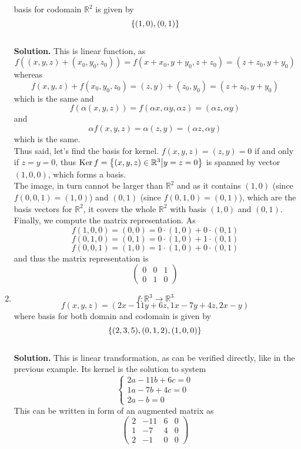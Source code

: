 \documentclass[12pt]{article} %
\begin{document}
\begin{enumerate}
	basis for codomain $\mathbb{R}^2$ is given by
	\[\left\{(1,0),(0,1)\right\}\]
	\\\textbf{Solution.} This is linear function, as
	\[f((x,y,z)+(x_0,y_0,z_0))=f(x+x_0,y+y_0,z+z_0)=(z+z_0,y+y_0)\]
	whereas 
	\[f(x,y,z)+f(x_0,y_0,z_0)=(z,y)+(z_0,y_0)=(z+z_0,y+y_0)\]
	which is the same and
	\[f(\alpha(x,y,z))=f(\alpha x,\alpha y,\alpha z)=(\alpha z,\alpha y)\]
	and
	\[\alpha f(x,y,z)=\alpha(z,y)=(\alpha z,\alpha y)\]
	which is the same.\\
	Thus said, let's find the basis for kernel. $f(x,y,z)=(z,y)=0$ if and only if $z=y=0$, thus
	$\operatorname{Ker} f=\left\{(x,y,z)\in\mathbb{R}^3\big| y=z=0\right\}$ is spanned by vector $(1,0,0)$, which forms a basis.\\
	The image, in turn cannot be larger than $\mathbb{R}^2$ and as it contains $(1,0)$ (since $f(0,0,1)=(1,0)$)
	and $(0,1)$ (since $f(0,1,0)=(0,1)$), which are the basis vectors for $\mathbb{R}^2$, it covers the whole $\mathbb{R}^2$
	with basis $(1,0)$ and $(0,1)$.\\
	Finally, we compute the matrix representation. As
	\[f(1,0,0)=(0,0)=0\cdot(1,0)+0\cdot(0,1)\]
	\[f(0,1,0)=(0,1)=0\cdot(1,0)+1\cdot(0,1)\]
	\[f(0,0,1)=(1,0)=1\cdot(1,0)+0\cdot(0,1)\]
	and thus the matrix representation is
	\[\begin{pmatrix}0&0&1\\0&1&0\end{pmatrix}\]
\item \[f:\mathbb{R}^3\to\mathbb{R}^3\]%
	\[f(x,y,z)=(2x-11y+6z,1x-7y+4z,2x-y)\]
	where basis for both domain and codomain is given by
	\[\left\{(2,3,5),(0,1,2),(1,0,0)\right\}\]
	\\\textbf{Solution.} 
	This is linear transformation, as can be verified directly, like in the previous example. Its kernel is the solution
	to system
	\[\begin{cases}2a-11b+6c=0\\1a-7b+4c=0\\2a-b=0\end{cases}\]
	This can be written in form of an augmented matrix as
	\newcommand{\myexplainiii}[3]{#1\xrightarrow{\text{#2}}#3}
	\newcommand{\myexplainiv}[4]{#1\xrightarrow{\begin{subarray}{c}\text{#2}\\\text{#3}\end{subarray}}#4}
	\[\left(\begin{array}{rrr|r}2&-11&6&0\\1&-7&4&0\\2&-1&0&0\end{array}\right)\]

\end{enumerate}
\end{document}
